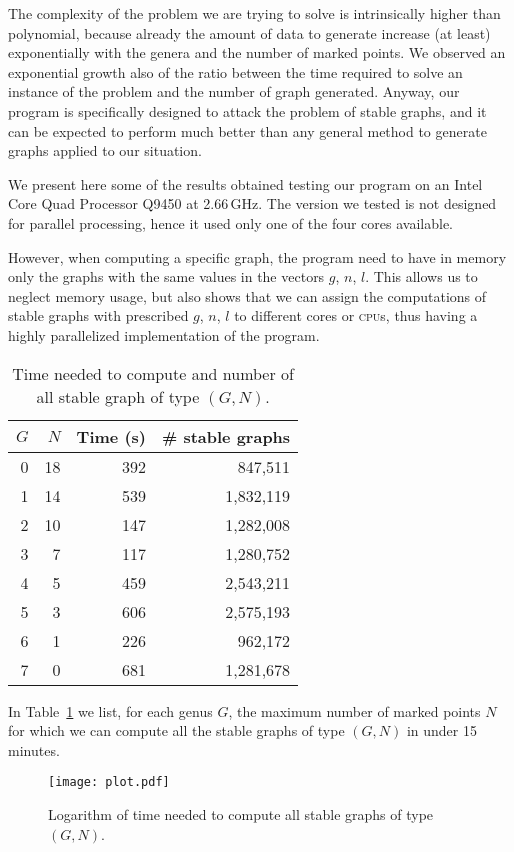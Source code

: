 \documentclass{amsart}
\theoremstyle{plain}
\theoremstyle{definition}
\begin{document}
The complexity of the problem we are trying to solve is intrinsically
higher than polynomial, because already the amount of data to generate
increase (at least) exponentially with the genera and the number of
marked points. We observed an exponential growth also of the ratio
between the time required to solve an instance of the problem and the
number of graph generated. Anyway, our program is specifically
designed to attack the problem of stable graphs, and it can be
expected to perform much better than any general method to generate
graphs applied to our situation.

We present here some of the results obtained testing our program on an
Intel\textregistered{} Core Quad Processor Q9450 at
2.66\,GHz. The version we tested is not designed for parallel
processing, hence it used only one of the four cores
available.

However, when computing a specific graph, the program need to have in
memory only the graphs with the same values in the vectors $g$, $n$,
$l$. This allows us to neglect memory usage, but also shows that we
can assign the computations of stable graphs with prescribed $g$, $n$,
$l$ to different cores or \textsc{cpu}s, thus having a highly
parallelized implementation of the program.

\begin{table}\label{tab:number}
  \caption{Time needed to compute and number of all stable graph of type $(G,N)$.}
  \begin{tabular}{rrrr}
    $G$ & $N$ & Time (s) & \# stable graphs\\
    \hline
    0 & 18 & 392 &   847,511\\
    1 & 14 & 539 & 1,832,119\\
    2 & 10 & 147 & 1,282,008\\
    3 &  7 & 117 & 1,280,752\\
    4 &  5 & 459 & 2,543,211\\
    5 &  3 & 606 & 2,575,193\\
    6 &  1 & 226 &   962,172\\
    7 &  0 & 681 & 1,281,678\\
  \end{tabular}
\end{table}

In Table~\ref{tab:number} we list, for each genus $G$, the maximum
number of marked points $N$ for which we can compute all the stable
graphs of type $(G, N)$ in under 15 minutes.

\begin{figure}\label{fig:plot}
  \caption{Logarithm of time needed to compute all stable graphs of
    type $(G, N)$.}
  \texttt{[image: plot.pdf]}
\end{figure}
\end{document}
